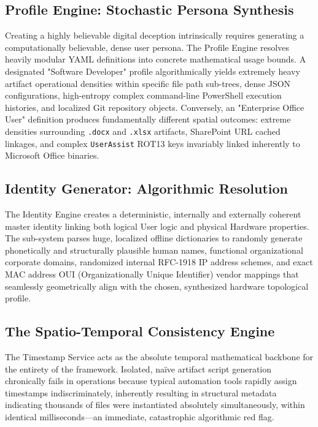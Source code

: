 \documentclass{ieeeaccess}
\begin{document}
\subsection{Profile Engine: Stochastic Persona Synthesis}
Creating a highly believable digital deception intrinsically requires generating a computationally believable, dense user persona. The Profile Engine resolves heavily modular YAML definitions into concrete mathematical usage bounds. A designated "Software Developer" profile algorithmically yields extremely heavy artifact operational densities within specific file path sub-trees, dense JSON configurations, high-entropy complex command-line PowerShell execution histories, and localized Git repository objects. Conversely, an "Enterprise Office User" definition produces fundamentally different spatial outcomes: extreme densities surrounding \texttt{.docx} and \texttt{.xlsx} artifacts, SharePoint URL cached linkages, and complex \texttt{UserAssist} ROT13 keys invariably linked inherently to Microsoft Office binaries.

\subsection{Identity Generator: Algorithmic Resolution}
The Identity Engine creates a deterministic, internally and externally coherent master identity linking both logical User logic and physical Hardware properties. The sub-system parses huge, localized offline dictionaries to randomly generate phonetically and structurally plausible human names, functional organizational corporate domains, randomized internal RFC-1918 IP address schemes, and exact MAC address OUI (Organizationally Unique Identifier) vendor mappings that seamlessly geometrically align with the chosen, synthesized hardware topological profile.

\subsection{The Spatio-Temporal Consistency Engine}
The Timestamp Service acts as the absolute temporal mathematical backbone for the entirety of the framework. Isolated, naïve artifact script generation chronically fails in operations because typical automation tools rapidly assign timestamps indiscriminately, inherently resulting in structural metadata indicating thousands of files were instantiated absolutely simultaneously, within identical milliseconds—an immediate, catastrophic algorithmic red flag.
\end{document}
